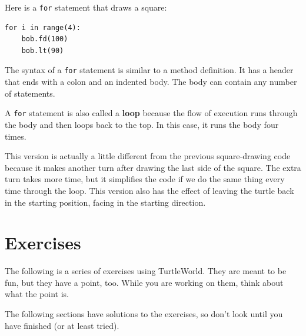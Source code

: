 \documentclass[10pt]{book}
\begin{document}
Here is a {\tt for} statement that draws a square:

\begin{verbatim}
for i in range(4):
    bob.fd(100)
    bob.lt(90)
\end{verbatim}
%
The syntax of a {\tt for} statement is similar to a method
definition.  It has a header that ends with a colon and an indented
body.  The body can contain any number of statements.

A {\tt for} statement is also called a {\bf loop} because
the flow of execution runs through the body and then loops back
to the top.  In this case, it runs the body four times.

This version is actually a little different from the previous
square-drawing code because it makes another turn after
drawing the last side of the square.  The extra turn takes
more time, but it simplifies the code if we do the same thing
every time through the loop.  This version also has the effect
of leaving the turtle back in the starting position, facing in
the starting direction.

\section{Exercises}

The following is a series of exercises using TurtleWorld.  They
are meant to be fun, but they have a point, too.  While you are
working on them, think about what the point is.

The following sections have solutions to the exercises, so
don't look until you have finished (or at least tried).
\end{document}
